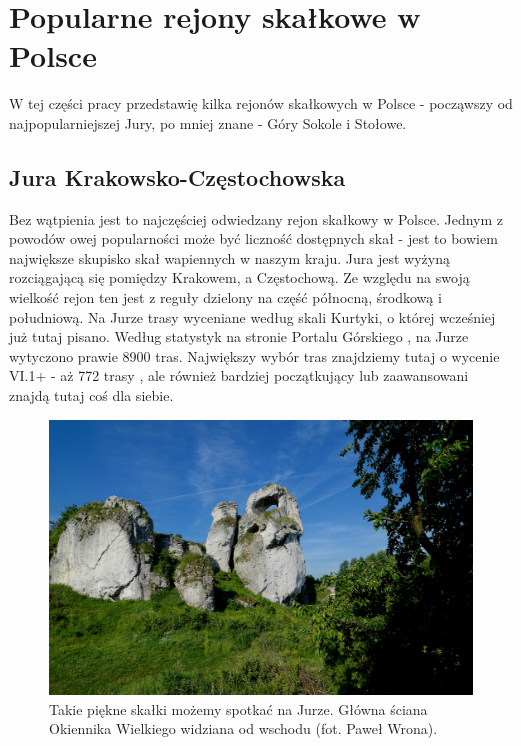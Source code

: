 \documentclass{article}
\begin{document}
\section{Popularne rejony skałkowe w Polsce}
\lettrine[lines=2]{W}{} tej części pracy przedstawię kilka rejonów skałkowych w Polsce - począwszy od najpopularniejszej Jury, po mniej znane - Góry Sokole i Stołowe.

\subsection{Jura Krakowsko-Częstochowska}
Bez wątpienia jest to najczęściej odwiedzany rejon skałkowy w Polsce. Jednym z powodów owej popularności może być liczność dostępnych skał - jest to bowiem największe skupisko skał wapiennych w naszym kraju. Jura jest wyżyną rozciągającą się pomiędzy Krakowem, a Częstochową. Ze względu na swoją wielkość rejon ten jest z reguły dzielony na część północną, środkową i południową. Na Jurze trasy wyceniane według skali Kurtyki, o której wcześniej już tutaj pisano. Według statystyk na stronie Portalu Górskiego \cite{topo-jura}, na Jurze wytyczono prawie 8900 tras. Największy wybór tras znajdziemy tutaj o wycenie VI.1+ - aż 772 trasy \cite{topo-jura}, ale również bardziej początkujący lub zaawansowani znajdą tutaj coś dla siebie.

\begin{figure}[!htbp]
	\begin{center}
		\includegraphics[width=0.9\linewidth]{images/jura-okiennik.eps}
	\end{center}
	\caption{Takie piękne skałki możemy spotkać na Jurze. Główna ściana Okiennika Wielkiego widziana od wschodu (fot. Paweł Wrona)\cite{jura-okiennik}.}
	\label{}
\end{figure}
\end{document}
